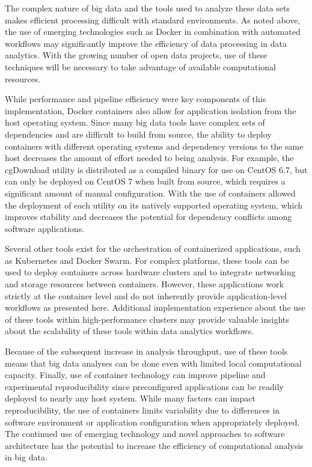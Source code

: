 \documentclass[sigconf]{acmart}
\begin{document}
	The complex nature of big data and the tools used to analyze these data sets makes efficient processing difficult with standard environments. As noted above, the use of emerging technologies such as Docker in combination with automated workflows may significantly improve the efficiency of data processing in data analytics. With the growing number of open data projects, use of these techniques will be necessary to take advantage of available computational resources.
	
	While performance and pipeline efficiency were key components of this implementation, Docker containers also allow for application isolation from the host operating system. Since many big data tools have complex sets of dependencies and are difficult to build from source, the ability to deploy containers with different operating systems and dependency versions to the same host decreases the amount of effort needed to being analysis. For example, the cgDownload utility is distributed as a compiled binary for use on CentOS 6.7, but can only be deployed on CentOS 7 when built from source, which requires a significant amount of manual configuration. With the use of containers allowed the deployment of each utility on its natively supported operating system, which improves stability and decreases the potential for dependency conflicts among software applications.
	
	Several other tools exist for the orchestration of containerized applications, such as Kubernetes and Docker Swarm. For complex platforms, these tools can be used to deploy containers across hardware clusters and to integrate networking and storage resources between containers. However, these applications work strictly at the container level and do not inherently provide application-level workflows as presented here. Additional implementation experience about the use of these tools within high-performance clusters may provide valuable insights about the scalability of these tools within data analytics workflows.
	
	Because of the subsequent increase in analysis throughput, use of these tools means that big data analyses can be done even with limited local computational capacity. Finally, use of container technology can improve pipeline and experimental reproducibility since preconfigured applications can be readily deployed to nearly any host system. While many factors can impact reproducibility, the use of containers limits variability due to differences in software environment or application configuration when appropriately deployed. The continued use of emerging technology and novel approaches to software architecture has the potential to increase the efficiency of computational analysis in big data.


 


\end{document}
